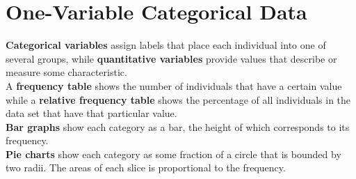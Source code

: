 \documentclass[../AP_Statistics.tex]{subfiles}
\begin{document}
	\chapter{One-Variable Categorical Data}
		\textbf{Categorical variables} assign labels that place each individual into one of several groups, while \textbf{quantitative variables} provide values that describe or measure some characteristic. \\
		A \textbf{frequency table} shows the number of individuals that have a certain value while a \textbf{relative frequency table} shows the percentage of all individuals in the data set that have that particular value. \\
		\textbf{Bar graphs} show each category as a bar, the height of which corresponds to its frequency. \\
		\textbf{Pie charts} show each category as some fraction of a circle that is bounded by two radii. The areas of each slice is proportional to the frequency. \\
		
\end{document}
